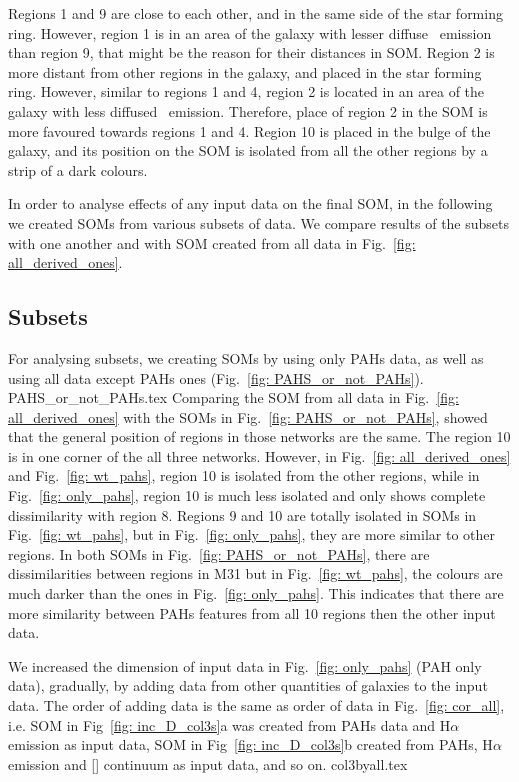     Regions 1 and 9 are close to each other, and in the same side of the star forming ring. 
    However, region 1 is in an area of the galaxy with lesser diffuse \halpha~emission than region 9, that might be the reason for their distances in SOM.
    Region 2 is more distant from other regions in the galaxy, and placed in the star forming ring.
    However, similar to regions 1 and 4, region 2 is located in an area of the galaxy with less diffused \halpha~emission.
    Therefore, place of region 2 in the SOM is more favoured towards regions 1 and 4. 
    Region 10 is placed in the bulge of the galaxy, and its position on the SOM is isolated from all the other regions by a strip of a dark colours. 
    
    In order to analyse effects of any input data on the final SOM, in the following we created SOMs from various subsets of data.
    We compare results of the subsets with one another and with SOM created from all data in Fig.~\ref{fig: all_derived_ones}.

    \subsection{Subsets}
    \label{sec: subsets}
            For analysing subsets, we creating SOMs by using only PAHs data, as well as using all data except PAHs ones (Fig.~\ref{fig: PAHS_or_not_PAHs}).
             {PAHS_or_not_PAHs.tex}
            Comparing the SOM from all data in Fig.~\ref{fig: all_derived_ones} with the SOMs in Fig.~\ref{fig: PAHS_or_not_PAHs}, showed that the general position of regions in those networks are the same. 
            The region 10 is in one corner of the all three networks.
            However, in Fig.~\ref{fig: all_derived_ones} and Fig.~\ref{fig: wt_pahs}, region 10 is isolated from the other regions, while in Fig.~\ref{fig: only_pahs}, region 10 is much less isolated and only shows complete dissimilarity with region 8.
            Regions 9 and 10 are totally isolated in SOMs in Fig.~\ref{fig: wt_pahs}, but in Fig.~\ref{fig: only_pahs}, they are more similar to other regions.
            In both SOMs in Fig.~\ref{fig: PAHS_or_not_PAHs}, there are dissimilarities between regions in M31 but in Fig.~\ref{fig: wt_pahs}, the colours are much darker than the ones in Fig.~\ref{fig: only_pahs}.
            This indicates that there are more similarity between PAHs features from all 10 regions then the other input data.
            
            We increased the dimension of input data in Fig.~\ref{fig: only_pahs} (PAH only data), gradually, by adding data from other quantities of galaxies to the input data. 
            The order of adding data is the same as order of data in Fig.~\ref{fig: cor_all}, i.e. SOM in Fig~\ref{fig: inc_D_col3s}a was created from PAHs data and H$\alpha$ emission as input data, SOM in Fig~\ref{fig: inc_D_col3s}b created from PAHs, H$\alpha$ emission and [\sii] continuum as input data, and so on. 
            {col3byall.tex}
            
